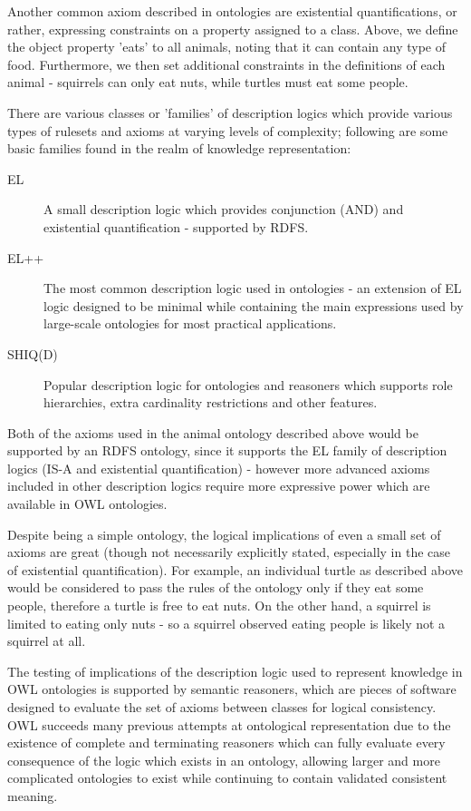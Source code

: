 \documentclass{article}
\begin{document}
Another common axiom described in ontologies are existential quantifications, or
rather, expressing constraints on a property assigned to a class. Above, we
define the object property 'eats' to all animals, noting that it can contain any
type of food. Furthermore, we then set additional constraints in the definitions
of each animal - squirrels can only eat nuts, while turtles must eat some
people.


There are various classes or 'families' of description logics which provide various 
types of rulesets and axioms at varying levels of complexity; following are some basic 
families found in the realm of knowledge representation:

\begin{description}
    \item[EL] A small description logic which provides conjunction (AND) and
    existential quantification - supported by RDFS.
    \item[EL++] The most common description logic used in ontologies - an
    extension of EL logic designed to be minimal while containing the main 
    expressions used by large-scale ontologies for most practical 
    applications.\cite{elplusplus}
    \item[SHIQ(D)] Popular description logic for ontologies and reasoners which
    supports role hierarchies, extra cardinality restrictions and other
    features. 
\end{description}

Both of the axioms used in the animal ontology described above would be
supported by an RDFS ontology, since it supports the EL family of description
logics (IS-A and existential quantification) - however more advanced axioms
included in other description logics require more expressive power which are
available in OWL ontologies.

Despite being a simple ontology, the logical implications of even a small set of
axioms are great (though not necessarily explicitly stated, especially in the
case of existential quantification). For example, an individual turtle as described 
above would be considered to pass the rules of the ontology only if they eat some 
people, therefore a turtle is free to eat nuts. On the other hand, a squirrel is limited
to eating only nuts - so a squirrel observed eating people is likely not a
squirrel at all.

The testing of implications of the description logic used to represent
knowledge in OWL ontologies is supported by semantic reasoners, which are 
pieces of software designed to evaluate the set of axioms between classes for 
logical consistency. OWL succeeds many previous attempts at ontological 
representation due to the existence of complete and terminating reasoners 
which can fully evaluate every consequence of the logic which exists in an 
ontology, allowing larger and more complicated ontologies to exist while 
continuing to contain validated consistent meaning.
\end{document}
